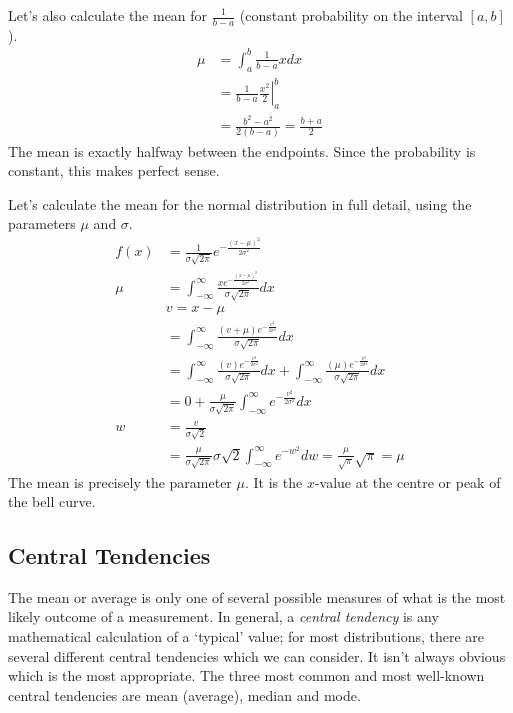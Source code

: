 \documentclass[fleqn]{report}
\begin{document}
\begin{example}
Let's also calculate the mean for $\frac{1}{b-a}$ (constant
probability on the interval $[a,b]$).
\begin{align*}
\mu & = \int_a^b \frac{1}{b-a} x dx \\
& = \left. \frac{1}{b-a} \frac{x^2}{2} \right|_a^b \\
& = \frac{b^2-a^2}{2(b-a)} = \frac{b+a}{2}
\end{align*}
The mean is exactly halfway between the endpoints. Since
the probability is constant, this makes perfect sense.
\end{example}

\begin{example}
Let's calculate the mean for the normal distribution in
full detail, using the parameters $\mu$ and $\sigma$. 
\begin{align*}
f(x) & = \frac{1}{\sigma
\sqrt{2\pi}}e^{-\frac{(x-\mu)^2}{2\sigma^2}} \\
\mu & = \int_{-\infty}^\infty
\frac{xe^{-\frac{(x-\mu)^2}{2\sigma^2}}}{\sigma \sqrt{2\pi}} dx
\\
& v = x-\mu \\
& = \int_{-\infty}^\infty
\frac{(v+\mu)e^{-\frac{v^2}{2\sigma^2}}}{\sigma \sqrt{2\pi}} dx \\
& = \int_{-\infty}^\infty
\frac{(v)e^{-\frac{v^2}{2\sigma^2}}}{\sigma \sqrt{2\pi}} dx 
+ \int_{-\infty}^\infty
\frac{(\mu)e^{-\frac{v^2}{2\sigma^2}}}{\sigma \sqrt{2\pi}} dx \\
& = 0 + \frac{\mu}{\sigma \sqrt{2\pi}} \int_{-\infty}^\infty
e^{-\frac{v^2}{2\sigma^2}} dx \\
w & = \frac{v}{\sigma \sqrt{2}} \\
& = \frac{\mu}{\sigma \sqrt{2\pi}} \sigma \sqrt{2} \int_{-\infty}^\infty
e^{-w^2} dw = \frac{\mu}{\sqrt{\pi}} \sqrt{\pi} = \mu 
\end{align*} 
The mean is precisely the parameter $\mu$. It is the
$x$-value at the centre or peak of the bell curve.
\end{example}

\subsection{Central Tendencies}
\label{central-tendencies}

The mean or average is only one of several possible
measures of what is the most likely outcome of a measurement.
In general, a \emph{central tendency} is any mathematical
calculation of a `typical' value; for most distributions, there
are several different central tendencies which we can
consider. It isn't always obvious which is the most
appropriate. The three most common and most well-known
central tendencies are mean (average), median and mode.
\end{document}
